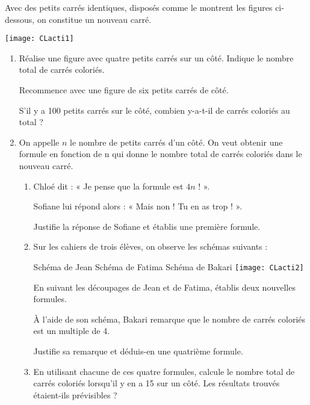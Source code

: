 \begin{activite}

Avec des petits carrés identiques, disposés comme le montrent les figures ci-dessous, on constitue un nouveau carré.

\begin{center}
    \texttt{[image: CLacti1]}
\end{center}

\begin{enumerate}
\item Réalise une figure avec quatre petits carrés sur un côté. Indique le nombre total de carrés coloriés.

Recommence avec une figure de six petits carrés de côté.

S'il y a 100 petits carrés sur le côté, combien y-a-t-il de carrés coloriés au total ?
\item On appelle $n$ le nombre de petits carrés d'un côté. On veut obtenir une formule en fonction de n qui donne le nombre total de carrés coloriés dans le nouveau carré.
    \begin{enumerate}
        \item Chloé dit : « Je pense que la formule est $4n$ ! ».
        
        Sofiane lui répond alors : « Mais non ! Tu en as trop ! ».

        Justifie la réponse de Sofiane et établis une première formule.
        
        \item Sur les cahiers de trois élèves, on observe les schémas suivants :
        
        \begin{center}
        Schéma de Jean \hfill Schéma de Fatima \hfill Schéma de Bakari
            \texttt{[image: CLacti2]}
        \end{center}

        En suivant les découpages de Jean et de Fatima, établis deux nouvelles formules.
        
        À l'aide de son schéma, Bakari remarque que le nombre de carrés coloriés est un multiple de 4.
        
        Justifie sa remarque et déduis-en une quatrième formule.
        
        \item En utilisant chacune de ces quatre formules, calcule le nombre total de carrés coloriés lorsqu'il y en a 15 sur un côté. Les résultats trouvés étaient-ils prévisibles ?
    \end{enumerate}
\end{enumerate}
\end{activite}



